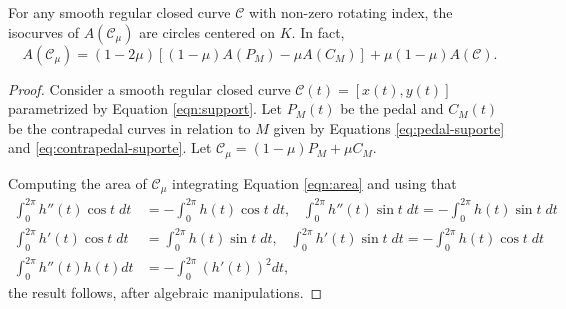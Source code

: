 	

	

	

\begin{proposition}
\label{prop:amu-concave}
For any smooth regular closed curve $\mathcal{C}$ with non-zero rotating index, the isocurves of $A(\mathcal{C}_\mu)$ are circles centered on $K$.
In fact, \[A(\mathcal{C}_\mu) =(1-2\mu)[(1-\mu) A(P_M)-\mu A(C_M)]+\mu(1-\mu)A(\mathcal{C}).\]
\end{proposition}

\begin{proof}
Consider a smooth regular closed curve $\mathcal{C}(t)=[x(t),y(t)]$ parametrized by Equation \eqref{eqn:support}. Let $P_M(t)$ be the pedal and $C_M(t)$ be the contrapedal   curves in relation to $M$ given by Equations \eqref{eq:pedal-suporte} and \eqref{eq:contrapedal-suporte}.
Let $\mathcal{C}_\mu=(1-\mu) P_M+{\mu}C_M$.
 	
 	Computing   the area of $\mathcal{C}_{\mu}$ integrating Equation \eqref{eqn:area} and  using that
 	\begin{align*}
 	 \int_0^{2\pi} h''(t)\cos t\; dt &=-\int_0^{2\pi} h(t)\cos{t} \;  dt,\;\;\;
 	     \int_0^{2\pi} h''(t)\sin t \;dt =-\int_0^{2\pi} h(t)\sin{t}\;dt  \\ 
 	   \int_0^{2\pi} h'(t)\cos t\; dt &=\int_0^{2\pi} h(t)\sin{t} \;  dt, \;\;\;
 	     \int_0^{2\pi} h'(t)\sin t \;dt =-\int_0^{2\pi} h(t)\cos{t}\;dt  \\
 	      \int_0^{2\pi} h''(t)h(t)dt &=-\int_0^{2\pi}(h'(t))^2dt,\; \;
 	\end{align*}
the result follows, after   algebraic manipulations.
\end{proof}

